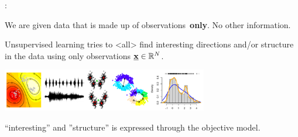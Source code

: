 \begin{frame}{\subsecname: \subsubsecname}

We are given data that is made up of observations\pause~\textbf{only}. No other information.


\end{frame}

\begin{frame}{\subsubsecname}


\pause

Unsupervised learning tries to 
\mode<all>
find interesting directions and/or structure in the data using only observations $\underline{\mathbf{x}} \in \mathbb{R}^N$.

\begin{center}
	\includegraphics[width=9cm]{img/mi2}
\end{center}

``interesting'' and  ''structure'' is expressed through the objective model.

\end{frame}

